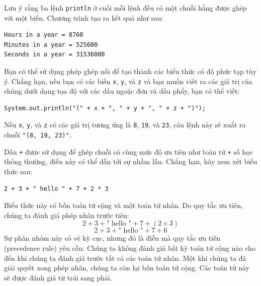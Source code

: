 Lưu ý rằng ba lệnh \texttt{println} ở cuối mỗi lệnh đều có một chuỗi
hằng được ghép với một biến. Chương trình tạo ra kết quả như sau:

\begin{verbatim}
Hours in a year = 8760 
Minutes in a year = 525600 
Seconds in a year = 31536000
\end{verbatim}

Bạn có thể sử dụng phép ghép nối để tạo thành các biểu thức có độ phức
tạp tùy ý. Chẳng hạn, nếu bạn có các biến \texttt{x}, \texttt{y}, và
\texttt{z} và bạn muốn viết ra các giá trị của chúng dưới dạng tọa độ
với các dấu ngoặc đơn và dấu phẩy, bạn có thể viết:

\begin{verbatim}
System.out.println("(" + x + ", " + y + ", " + z + ")");
\end{verbatim}

Nếu \texttt{x}, \texttt{y}, và \texttt{z} có các giá trị tương ứng là
\texttt{8}, \texttt{19}, và \texttt{23}, câu lệnh này sẽ xuất ra chuỗi
\texttt{"(8,\ 19,\ 23)"}.

Dấu \texttt{+} được sử dụng để ghép chuỗi có cùng mức độ ưu tiên như
toán tử \texttt{+} số học thông thường, điều này có thể dẫn tới sự nhầm
lẫn. Chẳng hạn, hãy xem xét biểu thức sau:

\begin{verbatim}
2 + 3 + " hello " + 7 + 2 * 3
\end{verbatim}

Biểu thức này có bốn toán tử cộng và một toán tử nhân. Do quy tắc ưu
tiên, chúng ta đánh giá phép nhân trước tiên:
\[ 2 + 3 + \text{" hello "} + 7 + (2 \times 3) \]
\[ 2 + 3 + \text{" hello "} + 7 + 6 \] Sự phân nhóm này có vẻ kỳ cục,
nhưng đó là điều mà quy tắc ưu tiên (precedence rule) yêu cầu: Chúng ta
không đánh giá bất kỳ toán tử cộng nào cho đến khi chúng ta đánh giá
trước tất cả các toán tử nhân. Một khi chúng ta đã giải quyết xong phép
nhân, chúng ta còn lại bốn toán tử cộng. Các toán tử này sẽ được đánh
giá từ trái sang phải.

